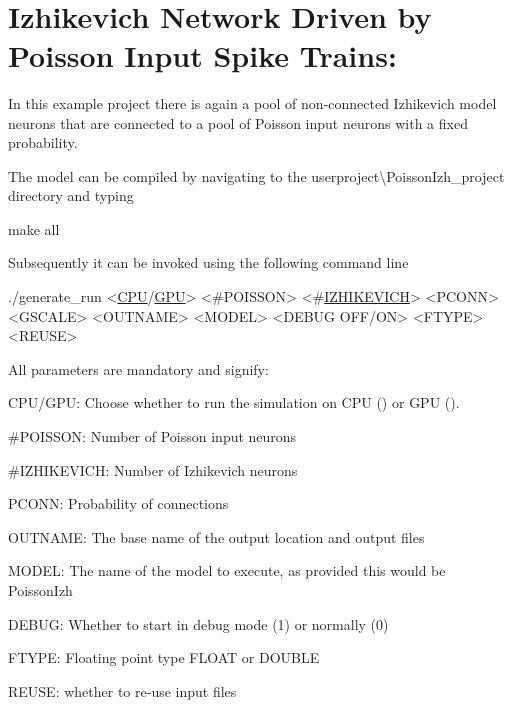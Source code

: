 ~\newline
\hypertarget{Examples_ex_poissonizh}{}\section{Izhikevich Network Driven by Poisson Input Spike Trains\+:}\label{Examples_ex_poissonizh}
In this example project there is again a pool of non-\/connected Izhikevich model neurons \cite{izhikevich2003simple} that are connected to a pool of Poisson input neurons with a fixed probability.

The model can be compiled by navigating to the {\ttfamily userproject\textbackslash{}Poisson\+Izh\+\_\+project} directory and typing 
\begin{DoxyCode}
make all
\end{DoxyCode}
 Subsequently it can be invoked using the following command line 
\begin{DoxyCode}
./generate\_run <\hyperlink{modelSpec_8h_ad703205f9a4d4bb6af9c25257c23ce6d}{CPU}/\hyperlink{modelSpec_8h_a39cb9803524b6f3b783344b2f89867b4}{GPU}> <#POISSON> <#\hyperlink{modelSpec_8h_a57aaf01a1c5e075bc2ad849b9b48db31}{IZHIKEVICH}> <PCONN> <GSCALE> <OUTNAME> <MODEL> <DEBUG
       OFF/ON> <FTYPE> <REUSE>
\end{DoxyCode}
 All parameters are mandatory and signify\+: \begin{DoxyItemize}
\item {\ttfamily C\+P\+U/\+G\+P\+U}\+: Choose whether to run the simulation on C\+P\+U ({}) or G\+P\+U ({}). \item {\ttfamily \#\+P\+O\+I\+S\+S\+O\+N}\+: Number of Poisson input neurons \item {\ttfamily \#I\+Z\+H\+I\+K\+E\+V\+I\+C\+H}\+: Number of Izhikevich neurons \item {\ttfamily P\+C\+O\+N\+N}\+: Probability of connections \item {\ttfamily O\+U\+T\+N\+A\+M\+E}\+: The base name of the output location and output files \item {\ttfamily M\+O\+D\+E\+L}\+: The name of the model to execute, as provided this would be {\ttfamily Poisson\+Izh} \item {\ttfamily D\+E\+B\+U\+G}\+: Whether to start in debug mode (1) or normally (0) \item {\ttfamily F\+T\+Y\+P\+E}\+: Floating point type {\ttfamily F\+L\+O\+A\+T} or {\ttfamily D\+O\+U\+B\+L\+E} \item {\ttfamily R\+E\+U\+S\+E}\+: whether to re-\/use input files\end{DoxyItemize}
